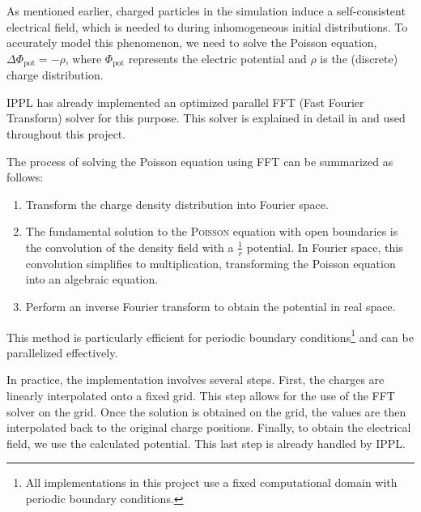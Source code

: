 As mentioned earlier, charged particles in the simulation induce a self-consistent electrical field, which is needed to during inhomogeneous initial distributions. To accurately model this phenomenon, we need to solve the Poisson equation, $\Delta \Phi_\mathrm{pot} = -\rho$, where $\Phi_\mathrm{pot}$ represents the electric potential and $\rho$ is the (discrete) charge distribution.

IPPL has already implemented an optimized parallel FFT (Fast Fourier Transform) solver for this purpose. This solver is explained in detail in \cite[2]{mayani2024massivelyparallelperformanceportable} and used throughout this project.

The process of solving the Poisson equation using FFT can be summarized as follows:
\begin{enumerate}
    \item Transform the charge density distribution into Fourier space.
    \item The fundamental solution to the \textsc{Poisson} equation with open boundaries is the convolution of the density field with a $\frac{1}{r}$ potential. In Fourier space, this convolution simplifies to multiplication, transforming the Poisson equation into an algebraic equation.
    \item Perform an inverse Fourier transform to obtain the potential in real space.
\end{enumerate}
This method is particularly efficient for periodic boundary conditions\footnote{All implementations in this project use a fixed computational domain with periodic boundary conditions.} and can be parallelized effectively. 

In practice, the implementation involves several steps. First, the charges are linearly interpolated onto a fixed grid. This step allows for the use of the FFT solver on the grid. Once the solution is obtained on the grid, the values are then interpolated back to the original charge positions. Finally, to obtain the electrical field, we use the calculated potential. This last step is already handled by IPPL.



